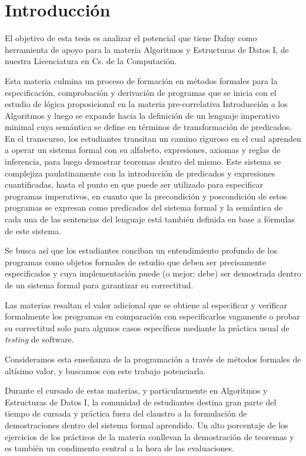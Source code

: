 \documentclass[12pt, a4paper, openany, fleqn]{book}
\begin{document}
    \chapter{Introducción}
    El objetivo de esta tesis es analizar el potencial que tiene Dafny como herramienta de apoyo para la materia Algoritmos y Estructuras de Datos I, de nuestra Licenciatura en Cs. de la Computación.

    Esta materia culmina un proceso de formación en métodos formales para la especificación, comprobación y derivación de programas que se inicia con el estudio de lógica proposicional en la materia pre-correlativa Introducción a los Algoritmos y luego se expande hacia la definición de un lenguaje imperativo minimal cuya semántica se define en términos de transformación de predicados.
    En el transcurso, los estudiantes transitan un camino riguroso en el cual aprenden a operar un sistema formal con su alfabeto, expresiones, axiomas y reglas de inferencia, para luego demostrar teoremas dentro del mismo. Este sistema se complejiza paulatinamente con la introducción de predicados y expresiones cuantificadas, hasta el punto en que puede ser utilizado para especificar programas imperativos, en cuanto que la precondición y poscondición de estos programas se expresan como predicados del sistema formal y la semántica de cada una de las sentencias del lenguaje está también definida en base a fórmulas de este sistema.

    Se busca así que los estudiantes conciban un entendimiento profundo de los programas como objetos formales de estudio que deben ser precisamente especificados y cuya implementación puede (o mejor: debe) ser demostrada dentro de un sistema formal para garantizar su correctitud.

    Las materias resaltan el valor adicional que se obtiene al especificar y verificar formalmente los programas en comparación con especificarlos vagamente o probar su correctitud solo para algunos casos específicos mediante la práctica usual de \textit{testing} de software.

    Consideramos esta enseñanza de la programación a través de métodos formales de altísimo valor, y buscamos con este trabajo potenciarla.

    Durante el cursado de estas materias, y particularmente en Algoritmos y Estructuras de Datos I, la comunidad de estudiantes destina gran parte del tiempo de cursada y práctica fuera del claustro a la formulación de demostraciones dentro del sistema formal aprendido. Un alto porcentaje de los ejercicios de los prácticos de la materia conllevan la demostración de teoremas y es también un condimento central a la hora de las evaluaciones.
\end{document}
